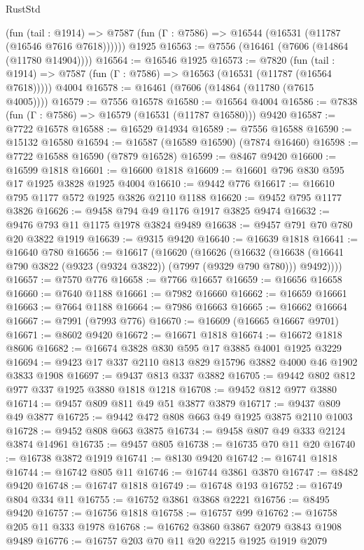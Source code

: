 \begin{lexlean}{RustStd}
\begin{coremodule}
      (fun (tail : @1914) =>
      @7587 (fun (Γ : @7586) => @16544 (@16531 (@11787 (@16546 @7616 @7618))))))
    @1925
@16563 := @7556 (@16461 (@7606 (@14864 (@11780 @14904))))
@16564 := @16546 @1925
@16573 := @7820
    (fun (tail : @1914) => @7587 (fun (Γ : @7586) => @16563 (@16531 (@11787 (@16564 @7618)))))
    @4004
@16578 := @16461 (@7606 (@14864 (@11780 (@7615 @4005))))
@16579 := @7556 @16578
@16580 := @16564 @4004
@16586 := @7838 (fun (Γ : @7586) => @16579 (@16531 (@11787 @16580))) @9420
@16587 := @7722 @16578
@16588 := @16529 @14934
@16589 := @7556 @16588
@16590 := @15132 @16580
@16594 := @16587 (@16589 @16590) (@7874 @16460)
@16598 := @7722 @16588 @16590 (@7879 @16528)
@16599 := @8467 @9420
@16600 := @16599 @1818
@16601 := @16600 @1818
@16609 := @16601 @796 @830 @595 @17 @1925 @3828 @1925 @4004
@16610 := @9442 @776
@16617 := @16610 @795 @1177 @572 @1925 @3826 @2110 @1188
@16620 := @9452 @795 @1177 @3826
@16626 := @9458 @794 @49 @1176 @1917 @3825 @9474
@16632 := @9476 @793 @11 @1175 @1978 @3824 @9489
@16638 := @9457 @791 @70 @780 @20 @3822 @1919
@16639 := @9315 @9420
@16640 := @16639 @1818
@16641 := @16640 @780
@16656 := @16617
    (@16620
      (@16626
        (@16632
          (@16638 (@16641 @790 @3822 (@9323 (@9324 @3822)) (@7997 (@9329 @790 @780))) @9492))))
@16657 := @7570 @776
@16658 := @7766 @16657
@16659 := @16656 @16658
@16660 := @7640 @1188
@16661 := @7982 @16660
@16662 := @16659 @16661
@16663 := @7664 @1188
@16664 := @7986 @16663
@16665 := @16662 @16664
@16667 := @7991 (@7993 @776)
@16670 := @16609 (@16665 @16667 @9701)
@16671 := @8602 @9420
@16672 := @16671 @1818
@16674 := @16672 @1818 @8606
@16682 := @16674 @3828 @830 @595 @17 @3885 @4001 @1925 @3229
@16694 := @9423 @17 @337 @2110 @813 @829 @15796 @3882 @4000 @46 @1902 @3833 @1908
@16697 := @9437 @813 @337 @3882
@16705 := @9442 @802 @812 @977 @337 @1925 @3880 @1818 @1218
@16708 := @9452 @812 @977 @3880
@16714 := @9457 @809 @811 @49 @51 @3877 @3879
@16717 := @9437 @809 @49 @3877
@16725 := @9442 @472 @808 @663 @49 @1925 @3875 @2110 @1003
@16728 := @9452 @808 @663 @3875
@16734 := @9458 @807 @49 @333 @2124 @3874 @14961
@16735 := @9457 @805
@16738 := @16735 @70 @11 @20
@16740 := @16738 @3872 @1919
@16741 := @8130 @9420
@16742 := @16741 @1818
@16744 := @16742 @805 @11
@16746 := @16744 @3861 @3870
@16747 := @8482 @9420
@16748 := @16747 @1818
@16749 := @16748 @193
@16752 := @16749 @804 @334 @11
@16755 := @16752 @3861 @3868 @2221
@16756 := @8495 @9420
@16757 := @16756 @1818
@16758 := @16757 @99
@16762 := @16758 @205 @11 @333 @1978
@16768 := @16762 @3860 @3867 @2079 @3843 @1908 @9489
@16776 := @16757 @203 @70 @11 @20 @2215 @1925 @1919 @2079

\end{coremodule}
\end{lexlean}
